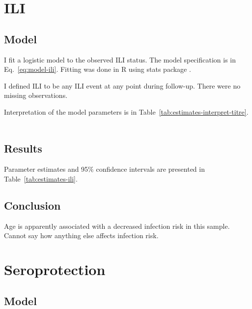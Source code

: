 \documentclass[11pt]{article}
\begin{document}
\section{ILI}

\subsection{Model}

I fit a logistic model to the observed ILI status.
The model specification is in Eq.~\ref{eq:model-ili}.
Fitting was done in R using stats package \cite{R}.

I defined ILI to be any ILI event at any point during follow-up. There were no
missing observations.

Interpretation of the model parameters is in
Table~\ref{tab:estimates-interpret-titre}.

\begin{equation}
  \begin{gathered}
    \label{eq:model-ili}
    
  \end{gathered}
\end{equation}





\subsection{Results}

Parameter estimates and 95\% confidence intervals
are presented in Table~\ref{tab:estimates-ili}.



\subsection{Conclusion}

Age is apparently associated with a decreased infection risk in this sample.
Cannot say how anything else affects infection risk.

\section{Seroprotection}

\subsection{Model}
\end{document}
